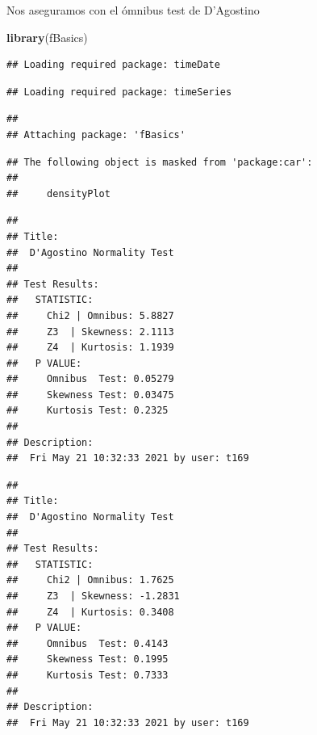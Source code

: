 \documentclass[
]{article}
\newenvironment{Shaded}{\begin{snugshade}}{\end{snugshade}}
\newcommand{\KeywordTok}[1]{\textcolor[rgb]{0.13,0.29,0.53}{\textbf{#1}}}
\newcommand{\NormalTok}[1]{#1}
\newcommand{\OperatorTok}[1]{\textcolor[rgb]{0.81,0.36,0.00}{\textbf{#1}}}
\newcommand{\StringTok}[1]{\textcolor[rgb]{0.31,0.60,0.02}{#1}}
\begin{document}
Nos aseguramos con el ómnibus test de D'Agostino

\begin{Shaded}
\begin{Highlighting}[]
\KeywordTok{library}\NormalTok{(fBasics)}
\end{Highlighting}
\end{Shaded}

\begin{verbatim}
## Loading required package: timeDate
\end{verbatim}

\begin{verbatim}
## Loading required package: timeSeries
\end{verbatim}

\begin{verbatim}
## 
## Attaching package: 'fBasics'
\end{verbatim}

\begin{verbatim}
## The following object is masked from 'package:car':
## 
##     densityPlot
\end{verbatim}

\begin{Shaded}
\end{Shaded}

\begin{verbatim}
## 
## Title:
##  D'Agostino Normality Test
## 
## Test Results:
##   STATISTIC:
##     Chi2 | Omnibus: 5.8827
##     Z3  | Skewness: 2.1113
##     Z4  | Kurtosis: 1.1939
##   P VALUE:
##     Omnibus  Test: 0.05279 
##     Skewness Test: 0.03475 
##     Kurtosis Test: 0.2325 
## 
## Description:
##  Fri May 21 10:32:33 2021 by user: t169
\end{verbatim}

\begin{Shaded}
\end{Shaded}

\begin{verbatim}
## 
## Title:
##  D'Agostino Normality Test
## 
## Test Results:
##   STATISTIC:
##     Chi2 | Omnibus: 1.7625
##     Z3  | Skewness: -1.2831
##     Z4  | Kurtosis: 0.3408
##   P VALUE:
##     Omnibus  Test: 0.4143 
##     Skewness Test: 0.1995 
##     Kurtosis Test: 0.7333 
## 
## Description:
##  Fri May 21 10:32:33 2021 by user: t169
\end{verbatim}
\end{document}
